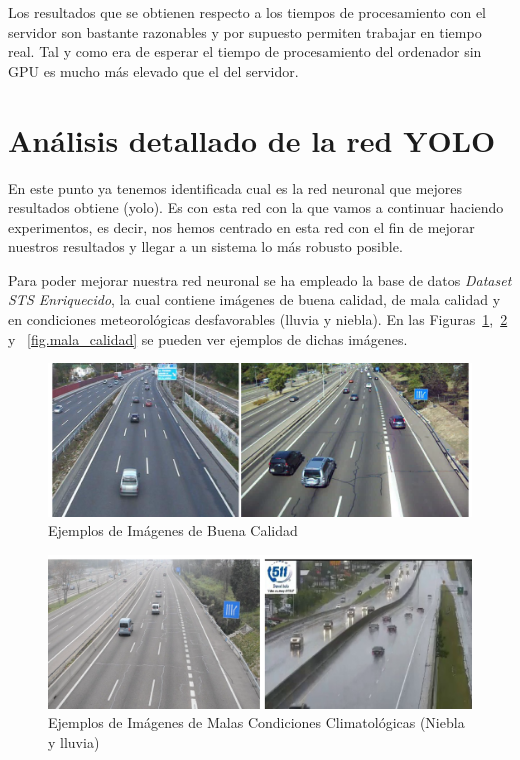 Los resultados que se obtienen respecto a los tiempos de procesamiento con el servidor son bastante razonables y por supuesto permiten trabajar en tiempo real. Tal y como era de esperar el tiempo de procesamiento del ordenador sin GPU es mucho más elevado que el del servidor.

\section{Análisis detallado de la red YOLO}

En este punto ya tenemos identificada cual es la red neuronal que mejores resultados obtiene (\acrshort{yolo}). Es con esta red con la que vamos a continuar haciendo experimentos, es decir, nos hemos centrado en esta red con el fin de mejorar nuestros resultados y llegar a un sistema lo más robusto posible.

Para poder mejorar nuestra red neuronal se ha empleado la base de datos \textit{Dataset STS Enriquecido}, la cual contiene imágenes de buena calidad, de mala calidad y en condiciones meteorológicas desfavorables (lluvia y niebla). En las Figuras~\ref{fig.buena_calidad},~\ref{fig.malas_condiciones} y ~\ref{fig.mala_calidad} se pueden ver ejemplos de dichas imágenes.

\begin{figure}[H] 
\begin{center}
	\includegraphics[width=1\textwidth]{figures/Experimentos/buena_calidad.png}
   \caption{Ejemplos de Imágenes de Buena Calidad}
	\label{fig.buena_calidad}
\end{center}
\end{figure}

\begin{figure}[H] 
\begin{center}
	\includegraphics[width=1\textwidth]{figures/Experimentos/malas_condiciones.png}
   \caption{Ejemplos de Imágenes de Malas Condiciones Climatológicas (Niebla y lluvia)}
	\label{fig.malas_condiciones}
\end{center}
\end{figure}

